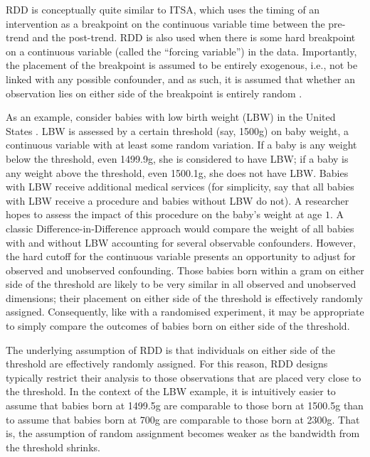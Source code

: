 \documentclass[12pt]{article}
\begin{document}
RDD is conceptually quite similar to ITSA, which uses the timing of an intervention as a breakpoint on the continuous variable time between the pre-trend and the post-trend. RDD is also used when there is some hard breakpoint on a continuous variable (called the ``forcing variable'') in the data. Importantly, the placement of the breakpoint is assumed to be entirely exogenous, i.e., not be linked with any possible confounder, and as such, it is assumed that whether an observation lies on either side of the breakpoint is entirely random \citep{hahnIdentificationEstimationTreatment2001}.

As an example, consider babies with low birth weight (LBW) in the United States \citep{almondEstimatingMarginalReturns2010a}. LBW is assessed by a certain threshold (say, 1500g) on baby weight, a continuous variable with at least some random variation. If a baby is any weight below the threshold, even 1499.9g, she is considered to have LBW; if a baby is any weight above the threshold, even 1500.1g, she does not have LBW. Babies with LBW receive additional medical services (for simplicity, say that all babies with LBW receive a procedure and babies without LBW do not). A researcher hopes to assess the impact of this procedure on the baby's weight at age $1$. A classic Difference-in-Difference approach would compare the weight of all babies with and without LBW accounting for several observable confounders. However, the hard cutoff for the continuous variable presents an opportunity to adjust for observed and unobserved confounding. Those babies born within a gram on either side of the threshold are likely to be very similar in all observed and unobserved dimensions; their placement on either side of the threshold is effectively randomly assigned. Consequently, like with a randomised experiment, it may be appropriate to simply compare the outcomes of babies born on either side of the threshold.

The underlying assumption of RDD is that individuals on either side of the threshold are effectively randomly assigned. For this reason, RDD designs typically restrict their analysis to those observations that are placed very close to the threshold. In the context of the LBW example, it is intuitively easier to assume that babies born at 1499.5g are comparable to those born at 1500.5g than to assume that babies born at 700g are comparable to those born at 2300g. That is, the assumption of random assignment becomes weaker as the bandwidth from the threshold shrinks.
\end{document}
